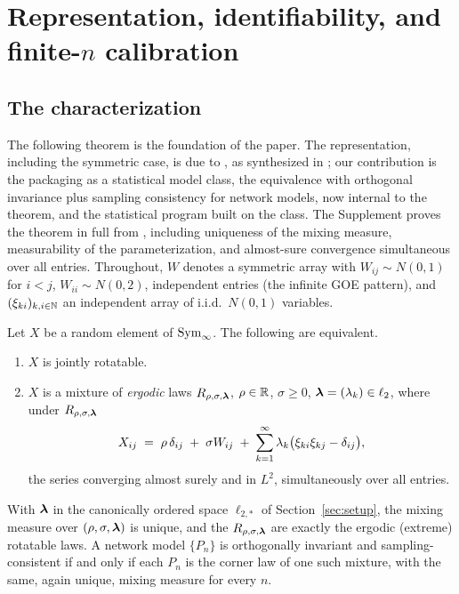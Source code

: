 \section{Representation, identifiability, and finite-$n$ calibration}
\label{sec:representation}

\subsection{The characterization}

The following theorem is the foundation of the paper. The
representation, including the symmetric case, is due to
\citet{kallenberg1988some,kallenberg1995multivariate}, as synthesized
in \citet[Chapter~8]{kallenberg2005probabilistic}; our contribution is the packaging as a statistical model class, the
equivalence with orthogonal invariance plus sampling consistency for
network models, now internal to the theorem, and the statistical
program built on the class. The Supplement proves the theorem in full
from \citet[Theorem~5.1]{kallenberg1988some}, including uniqueness of
the mixing measure, measurability of the parameterization, and
almost-sure convergence simultaneous over all entries. Throughout,
$W$ denotes a symmetric array with $W_{ij}\sim N(0,1)$ for $i<j$,
$W_{ii}\sim N(0,2)$, independent entries (the infinite GOE pattern), and
$(\xi_{ki})_{k,i\in\mathbb{N}}$ an independent array of i.i.d.\ $N(0,1)$ variables.

\begin{theorem}
\label{thm:rep}
Let $X$ be a random element of $\mathrm{Sym}_\infty$. The following are equivalent.
\begin{enumerate}[label=(\roman*),itemsep=1pt,topsep=2pt]
\item $X$ is jointly rotatable.
\item $X$ is a mixture of \emph{ergodic} laws
$R_{\rho,\sigma,\bm{\lambda}}$, $\rho\in\mathbb{R}$, $\sigma\ge0$,
$\bm{\lambda}=(\lambda_k)\in\ell_2$, where under $R_{\rho,\sigma,\bm{\lambda}}$
\begin{equation}
\label{eq:rep}
X_{ij} \;=\; \rho\,\delta_{ij} \;+\; \sigma W_{ij}
\;+\; \sum_{k=1}^{\infty} \lambda_k\bigl(\xi_{ki}\xi_{kj}-\delta_{ij}\bigr),
\end{equation}
the series converging almost surely and in $L^2$, simultaneously
over all entries.
\end{enumerate}
With $\bm{\lambda}$ in the canonically ordered space $\ell_{2,*}$ of
Section~\ref{sec:setup}, the mixing measure over
$(\rho,\sigma,\bm{\lambda})$ is unique, and the $R_{\rho,\sigma,\bm{\lambda}}$ are
exactly the ergodic (extreme) rotatable laws. A network model
$\{P_n\}$ is orthogonally invariant and sampling-consistent if and
only if each $P_n$ is the corner law of one such mixture, with the
same, again unique, mixing measure for every $n$.
\end{theorem}


